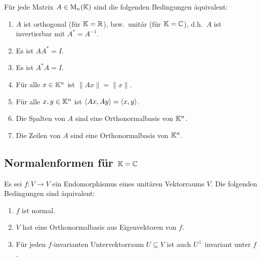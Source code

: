 \begin{corollary}
  Für jede Matrix $A \in \mathrm{M}_n(\mathbb{K})$ sind die folgenden Bedingungen äquivalent:
  \begin{enumerate}[leftmargin=*, label=\roman*)]
    \item
      $A$ ist orthogonal (für $\mathbb{K} = \mathbb{R}$), bzw.\ unitär (für $\mathbb{K} = \mathbb{C}$), d.h.\ $A$ ist invertierbar mit $A^* = A^{-1}$.
    \item
      Es ist $A A^* = I$.
    \item
      Es ist $A^* A = I$.
    \item
      Für alle $x \in \mathbb{K}^n$ ist $\|Ax\| = \|x\|$.
    \item
      Für alle $x, y \in \mathbb{K}^n$ ist $\left\langle Ax, Ay \right\rangle = \left\langle x, y \right\rangle$.
    \item
      Die Spalten von $A$ sind eine Orthonormalbasis von $\mathbb{K}^n$.
    \item
      Die Zeilen von $A$ sind eine Orthonormalbasis von $\mathbb{K}^n$.
  \end{enumerate}
\end{corollary}










\subsection{Normalenformen für \texorpdfstring{$\mathbb{K} = \mathbb{C}$}{K = C}}



\begin{theorem}
  Es sei $f \colon V \to V$ ein Endomorphismus eines unitären Vektorraums $V$.
  Die folgenden Bedingungen sind äquivalent:
  \begin{enumerate}[leftmargin=*, label=\roman*)]
    \item\label{enum: normal}
      $f$ ist normal.
    \item\label{enum: orthonormal basis of eigenvectors}
      $V$ hat eine Orthonormalbasis aus Eigenvektoren von $f$.
    \item\label{enum: orthogonal complements are invariant}
      Für jeden $f$-invarianten Untervektorraum $U \subseteq V$ ist auch $U^\perp$ invariant unter $f$.
  \end{enumerate}
\end{theorem}


